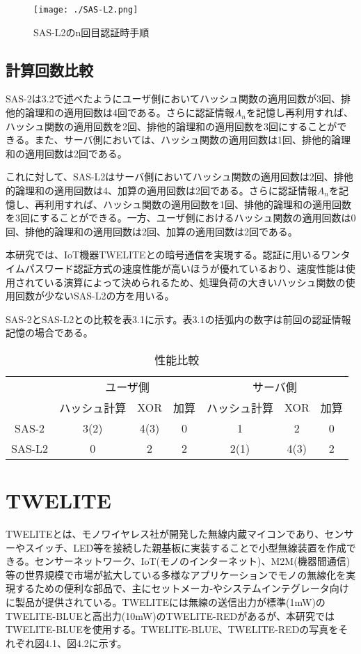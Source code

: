 \documentclass{thesis}
\begin{document}
\begin{figure}[H]
 \center
 \texttt{[image: ./SAS-L2.png]}
 \caption{SAS-L2のn回目認証時手順}
\end{figure}

\section{計算回数比較}

SAS-2は3.2で述べたようにユーザ側においてハッシュ関数の適用回数が3回、排他的論理和の適用回数は4回である。さらに認証情報$A_n$を記憶し再利用すれば、ハッシュ関数の適用回数を2回、排他的論理和の適用回数を3回にすることができる。また、サーバ側においては、ハッシュ関数の適用回数は1回、排他的論理和の適用回数は2回である。

これに対して、SAS-L2はサーバ側においてハッシュ関数の適用回数は2回、排他的論理和の適用回数は4、加算の適用回数は2回である。さらに認証情報$A_n$を記憶し、再利用すれば、ハッシュ関数の適用回数を1回、排他的論理和の適用回数を3回にすることができる。一方、ユーザ側におけるハッシュ関数の適用回数は0回、排他的論理和の適用回数は2回、加算の適用回数は2回である。

本研究では、IoT機器TWELITEとの暗号通信を実現する。認証に用いるワンタイムパスワード認証方式の速度性能が高いほうが優れているおり、速度性能は使用されている演算によって決められるため、処理負荷の大きいハッシュ関数の使用回数が少ないSAS-L2の方を用いる。

SAS-2とSAS-L2との比較を表3.1に示す。表3.1の括弧内の数字は前回の認証情報記憶の場合である。

\begin{table}[h]
  \centering
  \caption{性能比較}
  \begin{tabular}{|c|c|c|c|c|c|c|} \hline
    \multirow{2}{*}{ } & \multicolumn{3}{c|}{ユーザ側} & \multicolumn{3}{c|}{サーバ側} \\ \cline{2-7}
      & ハッシュ計算 & XOR & 加算 & ハッシュ計算 & XOR & 加算 \\ \hline
    SAS-2 & 3(2) & 4(3) & 0 & 1 & 2 & 0 \\ \hline
    SAS-L2 & 0 & 2 & 2 & 2(1) & 4(3) & 2 \\ \hline
  \end{tabular}
\end{table}

\chapter{TWELITE} 
\quad TWELITE\cite{ten}とは、モノワイヤレス社が開発した無線内蔵マイコンであり、センサーやスイッチ、LED等を接続した親基板に実装することで小型無線装置を作成できる。センサーネットワーク、IoT(モノのインターネット)、M2M(機器間通信)等の世界規模で市場が拡大している多様なアプリケーションでモノの無線化を実現するための便利な部品で、主にセットメーカ-やシステムインテグレータ向けに製品が提供されている。TWELITEには無線の送信出力が標準(1mW)のTWELITE-BLUEと高出力(10mW)のTWELITE-REDがあるが、本研究ではTWELITE-BLUEを使用する。TWELITE-BLUE、TWELITE-REDの写真をそれぞれ図4.1、図4.2に示す。
\end{document}
